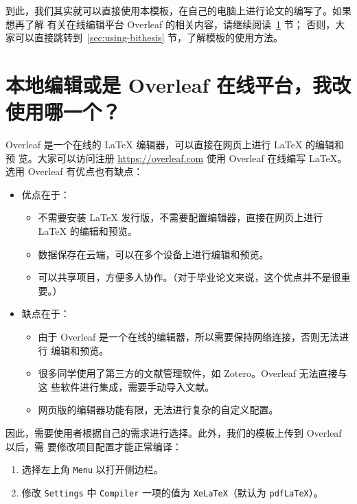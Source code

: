 到此，我们其实就可以直接使用本模板，在自己的电脑上进行论文的编写了。如果想再了解
有关在线编辑平台 Overleaf 的相关内容，请继续阅读~\ref{sec:online-overleaf} 节；
否则，大家可以直接跳转到~\ref{sec:using-bithesis} 节，了解模板的使用方法。

\section{本地编辑或是 Overleaf 在线平台，我改使用哪一个？}
\label{sec:online-overleaf}

Overleaf 是一个在线的 \LaTeX{} 编辑器，可以直接在网页上进行 \LaTeX{} 的编辑和预
览。大家可以访问注册 \url{https://overleaf.com} 使用 Overleaf 在线编写
\LaTeX{}。选用 Overleaf 有优点也有缺点：
\begin{itemize}[noitemsep]
  \item 优点在于：
    \begin{itemize}[noitemsep]
      \item 不需要安装 \LaTeX{} 发行版，不需要配置编辑器，直接在网页上进行
      \LaTeX{} 的编辑和预览。
      \item 数据保存在云端，可以在多个设备上进行编辑和预览。
      \item 可以共享项目，方便多人协作。（对于毕业论文来说，这个优点并不是很重
      要。）
    \end{itemize}
  \item 缺点在于：
    \begin{itemize}[noitemsep]
      \item 由于 Overleaf 是一个在线的编辑器，所以需要保持网络连接，否则无法进行
      编辑和预览。
      \item 很多同学使用了第三方的文献管理软件，如 Zotero。Overleaf 无法直接与这
      些软件进行集成，需要手动导入文献。
      \item 网页版的编辑器功能有限，无法进行复杂的自定义配置。
    \end{itemize}
\end{itemize}

因此，需要使用者根据自己的需求进行选择。此外，我们的模板上传到 Overleaf 以后，需
要修改项目配置才能正常编译：
\begin{enumerate}[noitemsep]
  \item 选择左上角 \texttt{Menu} 以打开侧边栏。
  \item 修改 \texttt{Settings} 中 \texttt{Compiler} 一项的值为 \texttt{XeLaTeX}（默认为 \texttt{pdfLaTeX}）。
\end{enumerate}
